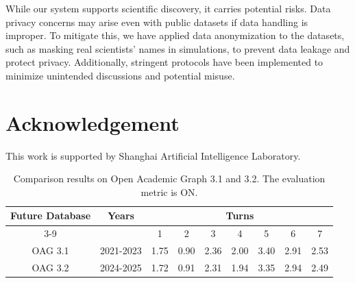 \documentclass[11pt]{article}
\begin{document}
While our system supports scientific discovery, it carries potential risks. Data privacy concerns may arise even with public datasets if data handling is improper. To mitigate this, we have applied data anonymization to the datasets, such as masking real scientists’ names in simulations, to prevent data leakage and protect privacy. Additionally, stringent protocols have been implemented to minimize unintended discussions and potential misuse.

\section*{Acknowledgement}
This work is supported by Shanghai Artificial Intelligence Laboratory.



\clearpage

\appendix
\renewcommand{\contentsname}{Appendix}
\tableofcontents
{} %

\begin{table}[t]
\centering
\begin{threeparttable}
\begin{tabular}{cc|ccccccc}
\toprule
 \multirow{2}{*}{Future Database} & \multirow{2}{*}{Years}   & \multicolumn{7}{c}{Turns} \\ \cmidrule{3-9}
 &   & 1 & 2 & 3 & 4 & 5 & 6 & 7\\
\midrule
 OAG 3.1 & 2021-2023 & 1.75 & 0.90 & 2.36 & 2.00 &  3.40 &  2.91 & 2.53 \\
OAG 3.2 & 2024-2025 & 1.72 & 0.91 & 2.31 & 1.94 & 3.35 & 2.94 & 2.49 \\
\bottomrule
\end{tabular}
\end{threeparttable}
\caption{Comparison results on Open Academic Graph 3.1 and 3.2. The evaluation metric is ON.}
\label{tab:data_leakage}
\end{table}
\end{document}
